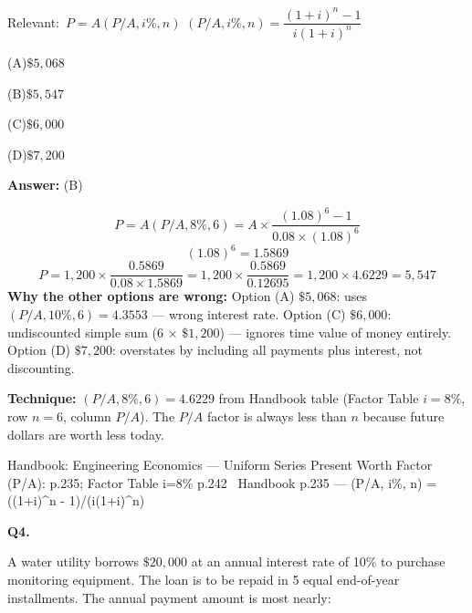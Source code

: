 \documentclass[11pt]{article}
\newcommand{\correct}[1]{\textbf{#1}\;{\color{accent}$\checkmark$}}
\newcommand{\optline}[2]{\par\noindent\hspace{1.2em}(#1)\hspace{0.6em}#2}
\begin{document}
{\small\color{soft}Relevant:}\ $P = A(P/A, i\%, n)$ \quad $(P/A, i\%, n) = \dfrac{(1+i)^n - 1}{i(1+i)^n}$\par\vspace{3pt}
\optline{A}{$\$5{,}068$}
\optline{B}{\correct{$\$5{,}547$}}
\optline{C}{$\$6{,}000$}
\optline{D}{$\$7{,}200$}
\par\vspace{3pt}
\vspace{2pt}\par\noindent\colorbox{boxbg}{\parbox{\dimexpr\linewidth-2\fboxsep\relax}{%
\vspace{2pt}\textbf{Answer:} (B)\par\vspace{2pt}
{\small \[P = A(P/A, 8\%, 6) = A \times \frac{(1.08)^6 - 1}{0.08 \times (1.08)^6}\]
\[(1.08)^6 = 1.5869\]
\[P = 1{,}200 \times \frac{0.5869}{0.08 \times 1.5869} = 1{,}200 \times \frac{0.5869}{0.12695} = 1{,}200 \times 4.6229 = 5{,}547\]
\textbf{Why the other options are wrong:} Option (A) $\$5{,}068$: uses $(P/A, 10\%, 6) = 4.3553$ --- wrong interest rate. Option (C) $\$6{,}000$: undiscounted simple sum (6 $\times$ $\$1{,}200$) --- ignores time value of money entirely. Option (D) $\$7{,}200$: overstates by including all payments plus interest, not discounting.\par
\textbf{Technique:} $(P/A, 8\%, 6) = 4.6229$ from Handbook table (Factor Table $i = 8\%$, row $n = 6$, column $P/A$). The $P/A$ factor is always less than $n$ because future dollars are worth less today.\par}\par\vspace{2pt}
{\footnotesize\color{soft}Handbook: Engineering Economics --- Uniform Series Present Worth Factor (P/A): p.235; Factor Table i=8\% p.242 \textbullet\ Handbook p.235 --- (P/A, i\%, n) = ((1+i)\textasciicircum{}n - 1)/(i(1+i)\textasciicircum{}n)}\vspace{2pt}
}}
\vspace{9pt}
\filbreak
\textbf{\color{accent}Q4.}\par\vspace{2pt}
A water utility borrows $\$20{,}000$ at an annual interest rate of 10\% to purchase monitoring equipment. The loan is to be repaid in 5 equal end-of-year installments. The annual payment amount is most nearly:\par\par\vspace{3pt}
\end{document}
